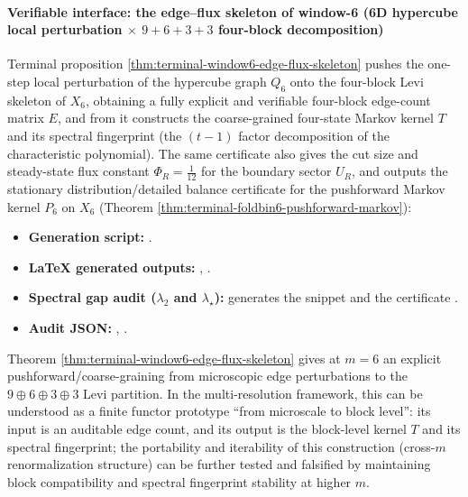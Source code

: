 \paragraph{Verifiable interface: the edge--flux skeleton of window-6 (6D hypercube local perturbation \(\times\) \(9+6+3+3\) four-block decomposition)}
Terminal proposition \ref{thm:terminal-window6-edge-flux-skeleton} pushes the one-step local perturbation of the hypercube graph \(Q_6\) onto the four-block Levi skeleton of \(X_6\),
obtaining a fully explicit and verifiable four-block edge-count matrix \(E\), and from it constructs the coarse-grained four-state Markov kernel \(T\) and its spectral fingerprint (the \((t-1)\) factor decomposition of the characteristic polynomial).
The same certificate also gives the cut size and steady-state flux constant \(\Phi_R=\frac1{12}\) for the boundary sector \(U_R\), and outputs the stationary distribution/detailed balance certificate for the pushforward Markov kernel \(P_6\) on \(X_6\) (Theorem \ref{thm:terminal-foldbin6-pushforward-markov}):
\begin{itemize}
  \item \textbf{Generation script:} \texttt{}.
  \item \textbf{LaTeX generated outputs:} \texttt{},
  \texttt{}.
  \item \textbf{Spectral gap audit (\(\lambda_2\) and \(\lambda_\star\)):}
  \texttt{} generates the snippet
  \texttt{}
  and the certificate \texttt{}.
  \item \textbf{Audit JSON:} \texttt{},
  \texttt{}.
\end{itemize}

\begin{remark}\label{rem:window6-edge-flux-coarse-graining-iterable}
Theorem \ref{thm:terminal-window6-edge-flux-skeleton} gives at \(m=6\) an explicit pushforward/coarse-graining from microscopic edge perturbations to the \(9\oplus 6\oplus 3\oplus 3\) Levi partition.
In the multi-resolution framework, this can be understood as a finite functor prototype ``from microscale to block level'': its input is an auditable edge count, and its output is the block-level kernel \(T\) and its spectral fingerprint;
the portability and iterability of this construction (cross-\(m\) renormalization structure) can be further tested and falsified by maintaining block compatibility and spectral fingerprint stability at higher \(m\).
\end{remark}

